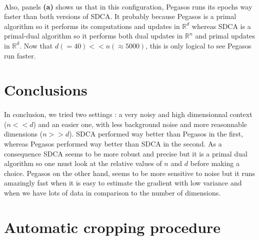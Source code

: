\documentclass[10pt,a4paper]{article}
\begin{document}
\paragraph{}
Also, panels \textbf{(a)} shows us that in this configuration, Pegasos runs its epochs way faster than both versions of SDCA. It probably because Pegasos is a primal algorithm so it performs its computations and updates in $\mathbb{R}^d$ whereas SDCA is a primal-dual algorithm so it performs both dual updates in $\mathbb{R}^n$ and primal updates in $\mathbb{R}^d$. Now that $d (=40) << n(\approx 5000)$, this is only logical to see Pegasos run faster. 


\section{Conclusions}

\paragraph{}
In conclusion, we tried two settings : a very noisy and high dimensionnal context ($n << d$) and an easier one, with less background noise and more reasonnable dimensions ($n >> d$). SDCA performed way better than Pegasos in the first, whereas Pegasos performed way better than SDCA in the second. As a consequence SDCA seems to be more robust and precise but it is a primal dual algorithm so one must look at the relative values of $n$ and $d$ before making a choice. Pegasos on the other hand, seems to be more sensitive to noise but it runs amazingly fast when it is easy to estimate the gradient with low variance and when we have lots of data in comparison to the number of dimensions. 


\printbibliography

\newpage

\appendix

\FloatBarrier
\section{Automatic cropping procedure}
\end{document}
